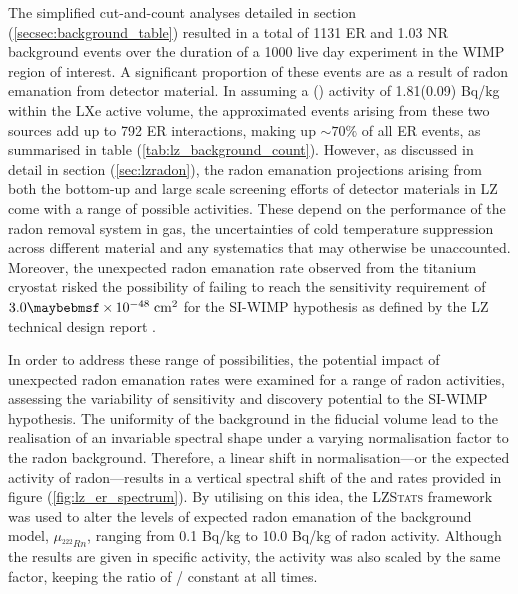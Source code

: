 {The simplified cut-and-count analyses detailed in section (\ref{secsec:background_table}) resulted in a total of 1131 ER and 1.03 NR background events over the duration of a 1000 live day experiment in the WIMP region of interest. A significant proportion of these events are as a result of radon emanation from detector material. In assuming a \RnTTT{}(\RnTTZ{}) activity of 1.81(0.09) \micro{}Bq/kg within the LXe active volume, the approximated events arising from these two sources add up to 792 ER interactions, making up $\sim70\%$ of all ER events, as summarised in table (\ref{tab:lz_background_count}). However, as discussed in detail in section (\ref{sec:lzradon}), the radon emanation projections arising from both the bottom-up and large scale screening efforts of detector materials in LZ come with a range of possible activities. These depend on the performance of the radon removal system in gas, the uncertainties of cold temperature suppression across different material and any systematics that may otherwise be unaccounted. Moreover, the unexpected radon emanation rate observed from the titanium cryostat risked the possibility of failing to reach the sensitivity requirement of $3.0 \times 10^{-48} \; \MathText{cm}^2$ for the SI-WIMP hypothesis as defined by the LZ technical design report \cite{lz_tdr}. 

In order to address these range of possibilities, the potential impact of unexpected radon emanation rates were examined for a range of radon activities, assessing the variability of sensitivity and discovery potential to the SI-WIMP hypothesis. The uniformity of the \RnTTT{} background in the fiducial volume lead to the realisation of an invariable spectral shape under a varying normalisation factor to the radon background. Therefore, a linear shift in normalisation---or the expected activity of radon---results in a vertical spectral shift of the \RnTTT{} and \RnTTZ{} rates provided in figure (\ref{fig:lz_er_spectrum}). By utilising on this idea, the \textsc{LZStats} framework was used to alter the levels of expected radon emanation of the background model, $\mu_{^{222}Rn}$, ranging from 0.1 \micro{}Bq/kg to 10.0 \micro{}Bq/kg of radon activity. Although the results are given in \RnTTT{} specific activity, the \RnTTZ{} activity was also scaled by the same factor, keeping the ratio of \RnTTT{}/\RnTTZ{} constant at all times. 

}
